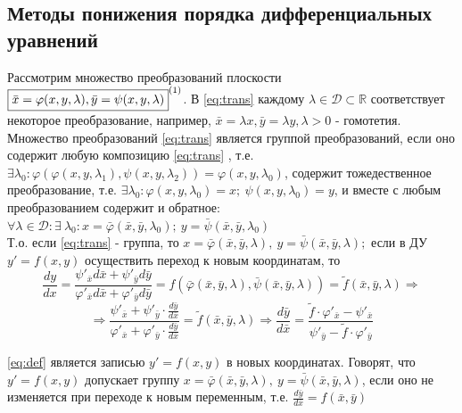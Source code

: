 \subsection*{Методы понижения порядка дифференциальных уравнений}
\begin{proposition}

	Рассмотрим множество преобразований плоскости \\ $ \boxed{\bar{x} = \varphi(x,y,\lambda), \bar{y} = \psi (x,y,\lambda)}^{\eqnum\label{eq:trans}} $. В \eqref{eq:trans} каждому $ \lambda \in \mathcal{ D }  \subset \mathbb{ R } $ соответствует некоторое преобразование, например, $ \bar{x} = \lambda x, \bar{y} = \lambda y, \lambda > 0 $ - гомотетия. Множество преобразований \eqref{eq:trans}  является группой преобразований, если оно содержит любую композицию \eqref{eq:trans} , т.е. 
	$ \exists \lambda_0 : \varphi(\varphi(x,y,\lambda_1), \psi(x,y,\lambda_2)) = \varphi(x,y,\lambda_0) $, содержит тожедественное преобразование, т.е. $ \exists \lambda_0: \varphi(x,y,\lambda_0) = x; \ \psi(x,y,\lambda_0) = y $, и вместе с любым преобразованием содержит и обратное: $ \forall \lambda \in \mathcal{D} \colon  \exists \ \lambda_0 \colon x = \bar{ \varphi } (\bar{x}, \bar{y}, \lambda_0); \ y = \bar{ \psi } (\bar{x}, \bar{y}, \lambda_0) $ \\
	Т.о. если \eqref{eq:trans} - группа, то $ x = \bar{ \varphi } (\bar{x}, \bar{y}, \lambda), \ y = \bar{ \psi } (\bar{x}, \bar{y}, \lambda);$ если в ДУ $ y' = f(x,y)$ осуществить переход к новым координатам, то \\
	$$
	\frac{dy}{dx} = \frac{ \psi'_{ \bar{x} } d\bar{x} +  \psi'_{ \bar{y} } d\bar{y} }{ \varphi'_{\bar{x}} d\bar{x} +  \varphi'_{\bar{y}} d\bar{y}} = f(\bar{ \varphi }(\bar{x}, \bar{y}, \lambda), \bar{ \psi }(\bar{x}, \bar{y}, \lambda)) = \tilde{f}(\bar{x}, \bar{y}, \lambda) \Rightarrow
	$$	
	\begin{equation} \label{eq:def}
	\Rightarrow \frac{ \psi'_{ \bar{x} } + \psi'_{ \bar{y} } \cdot \frac{d\bar{y}}{d\bar{x}} }{ \varphi'_{\bar{x}} +  \varphi'_{\bar{y}} \cdot \frac{d\bar{y}}{d\bar{x}} } = \tilde{f}(\bar{x}, \bar{y}, \lambda) \Rightarrow \frac{d\bar{y}}{d\bar{x}} = \frac{\tilde{f} \cdot \varphi'_{\bar{x}} - \psi'_{\bar{x} }}{\psi'_{\bar{y}} - \tilde{f} \cdot \varphi'_{\bar{y}}}
	\end{equation}  
	
	\noindent\eqref{eq:def} является записью $ y' = f(x,y) $ в новых координатах. Говорят, что $ y' = f(x,y) $ допускает группу $ x =\bar{ \varphi }(\bar{x}, \bar{y}, \lambda), \ y = \bar{ \psi } (\bar{x}, \bar{y}, \lambda)$, если оно не изменяется при переходе к новым переменным, т.е. $ \frac{d\bar{y}}{d\bar{x}} = f(\bar{x}, \bar{y}) $
\end{proposition}

